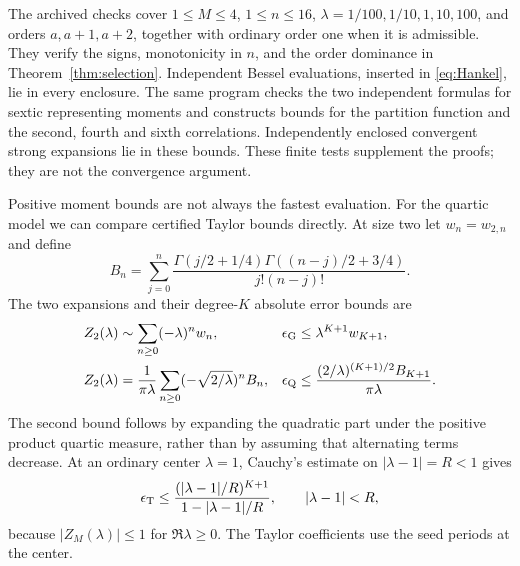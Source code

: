 \documentclass[11pt]{article}
\theoremstyle{definition}
\numberwithin{equation}{section}
\begin{document}
\begin{table}[ht]
\centering

\caption{Minimal-order bounds for $Z_M(1)$. The Gauss rule has $n$ nodes,
and Radau has $n+1$; moments through degree $2n$ suffice for the pair.
Displayed endpoints are rounded outward. Widths bound the unrounded
certified intervals.}\label{tab:quadrature}
\end{table}

The archived checks cover $1\le M\le4$, $1\le n\le16$,
$\lambda=1/100,1/10,1,10,100$, and orders
$a,a+1,a+2$, together with ordinary order one when it is admissible.
They verify the signs, monotonicity in $n$, and the order dominance in
Theorem~\ref{thm:selection}. Independent Bessel evaluations, inserted
in \eqref{eq:Hankel}, lie in every enclosure. The same program checks
the two independent formulas for sextic representing moments and
constructs bounds for the partition function and the second, fourth and
sixth correlations. Independently enclosed convergent strong expansions
lie in these bounds. These finite tests supplement
the proofs; they are not the convergence argument.

Positive moment bounds are not always the fastest evaluation. For the
quartic model we can compare certified Taylor bounds directly.
At size two let $w_n=w_{2,n}$ and define
\[
 B_n=\sum_{j=0}^n
 \frac{\Gamma(j/2+1/4)\Gamma((n-j)/2+3/4)}{j!(n-j)!}.
\]
The two expansions and their degree-$K$ absolute error bounds are
\begin{align*}
 Z_2(\lambda)&\sim\sum_{n\ge0}(-\lambda)^n w_n,
 &\epsilon_{\rm G}&\le\lambda^{K+1}w_{K+1},\\
 Z_2(\lambda)&=\frac1{\pi\lambda}
 \sum_{n\ge0}(-\sqrt{2/\lambda})^n B_n,
 &\epsilon_{\rm Q}&\le\frac{(2/\lambda)^{(K+1)/2}B_{K+1}}{\pi\lambda}.
\end{align*}
The second bound follows by expanding the quadratic part under the
positive product quartic measure, rather than by assuming that alternating
terms decrease. At an ordinary center $\lambda=1$, Cauchy's estimate on
$|\lambda-1|=R<1$ gives
\[
 \epsilon_{\rm T}\le
 \frac{(|\lambda-1|/R)^{K+1}}{1-|\lambda-1|/R},
 \qquad |\lambda-1|<R,
\]
because $|Z_M(\lambda)|\le1$ for $\Re\lambda\ge0$.
The Taylor coefficients use the seed periods at the center.
\end{document}
